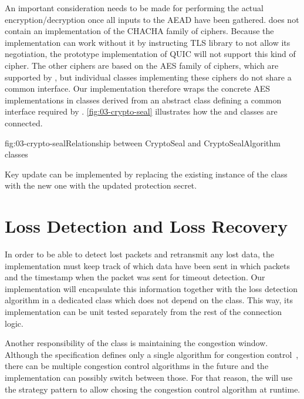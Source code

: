 An important consideration needs to be made for performing the actual encryption/decryption once all
inputs to the AEAD have been gathered. \dotnet{} does not contain an implementation of the CHACHA
family of ciphers. Because the implementation can work without it by instructing TLS library to not
allow its negotiation, the prototype implementation of QUIC will not support this kind of cipher.
The other ciphers are based on the AES family of ciphers, which are supported by \dotnet{}, but
individual classes implementing these ciphers do not share a common interface. Our implementation
therefore wraps the concrete AES implementations in classes derived from an abstract
 class defining a common interface required by \CryptoSeal{}.
\autoref{fig:03-crypto-seal} illustrates how the \CryptoSeal{} and 
classes are connected.

\begin{myFigure}{fig:03-crypto-seal}{Relationship between CryptoSeal and CryptoSealAlgorithm classes}

  \resizebox{\linewidth}{!}{}

\end{myFigure}

Key update can be implemented by replacing the existing instance of the
\CryptoSeal{} class with the new one with the updated protection secret.

\section{Loss Detection and Loss Recovery}

In order to be able to detect lost packets and retransmit any lost data, the \QuicConnection{}
implementation must keep track of which data have been sent in which packets and the timestamp when
the packet was sent for timeout detection. Our implementation will encapsulate this information
together with the loss detection algorithm in a dedicated \RecoveryController{} class which does not
depend on the \QuicConnection{} class. This way, its implementation can be unit tested separately
from the rest of the connection logic.

Another responsibility of the \RecoveryController{} class is maintaining the congestion window.
Although the specification defines only a single algorithm for congestion
control~\cite[Section~7]{draft-ietf-quic-recovery}, there can be multiple congestion control
algorithms in the future and the implementation can possibly switch between those. For that reason,
the \RecoveryController{} will use the strategy pattern 
to allow chosing the congestion control algorithm at runtime.


